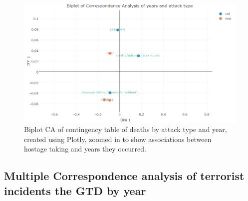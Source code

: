 \begin{figure}[t]
\includegraphics[width=15cm]{Peters_experiment_markdown_files/figure-latex/hostagetakingbiplot.png}
\caption{Biplot CA of contingency table of deaths by attack type and year, created using Plotly, zoomed in to show associations between hostage taking and years they occurred.}
\label{fig:biplotattacktypeca3}
\centering
\end{figure}


\subsection{Multiple Correspondence analysis of terrorist incidents the GTD by year}\label{viewing-deaths-by-attack-vector-type-MCA}

